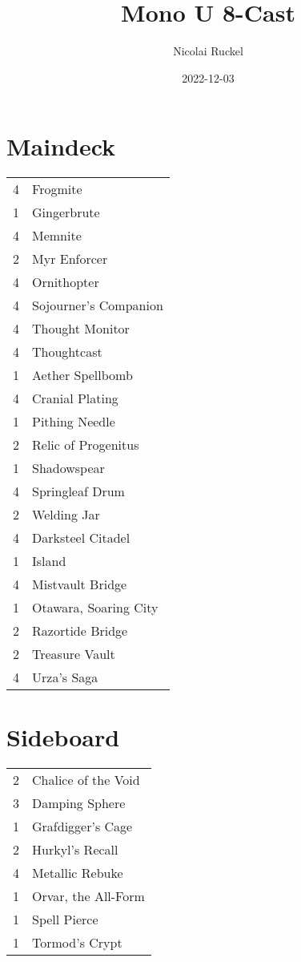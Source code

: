 \documentclass[fontsize=12pt,paper=a4]{scrartcl}
\title{Mono U 8-Cast}
\author{Nicolai Ruckel}
\date{2022-12-03}
\newenvironment{decklist}{%
    \begin{tabular}{>{\hspace{-4pt}}r<{\hspace{-3pt}}>{\hspace{-3pt}}l<{\hspace{-4pt}}}
    }{%
    \end{tabular}
    \par
}
\newcommand{\card}[2]{#1 & #2\\}
\begin{document}
\maketitle
\pagestyle{empty}

\begin{multicols}{2}
\section*{Maindeck}
    \begin{decklist}
        \card{4}{Frogmite}
        \card{1}{Gingerbrute}
        \card{4}{Memnite}
        \card{2}{Myr Enforcer}
        \card{4}{Ornithopter}
        \card{4}{Sojourner's Companion}
        \card{4}{Thought Monitor}
        \card{4}{Thoughtcast}
        \card{1}{Aether Spellbomb}
        \card{4}{Cranial Plating}
        \card{1}{Pithing Needle}
        \card{2}{Relic of Progenitus}
        \card{1}{Shadowspear}
        \card{4}{Springleaf Drum}
        \card{2}{Welding Jar}
        \card{4}{Darksteel Citadel}
        \card{1}{Island}
        \card{4}{Mistvault Bridge}
        \card{1}{Otawara, Soaring City}
        \card{2}{Razortide Bridge}
        \card{2}{Treasure Vault}
        \card{4}{Urza's Saga}
    \end{decklist}

    \section*{Sideboard}
    \begin{decklist}
        \card{2}{Chalice of the Void}
        \card{3}{Damping Sphere}
        \card{1}{Grafdigger's Cage}
        \card{2}{Hurkyl's Recall}
        \card{4}{Metallic Rebuke}
        \card{1}{Orvar, the All-Form}
        \card{1}{Spell Pierce}
        \card{1}{Tormod's Crypt}
    \end{decklist}
\end{multicols}


\end{document}
